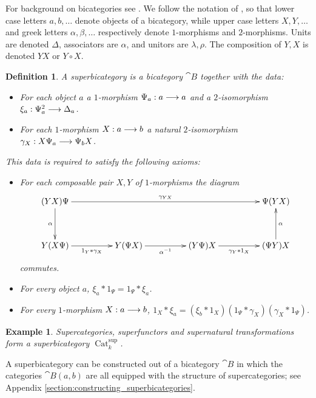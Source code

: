 \documentclass[english,letter paper,12pt,leqno]{article}
\theoremstyle{example}
\newtheorem{definition}[theorem]{Definition}
\newtheorem{example}[theorem]{Example}
\numberwithin{equation}{section}
\DeclareMathOperator{\Cat}{Cat}
\begin{document}
For background on bicategories see \cite{bor94, benabou, gray, kellystreet, lack}. We follow the notation of \cite{lgdual}, so that lower case letters $a,b, \ldots$ denote objects of a bicategory, while upper case letters $X,Y, \ldots$ and greek letters $\alpha, \beta, \ldots$ respectively denote $1$-morphisms and $2$-morphisms. Units are denoted $\Delta$, associators are $\alpha$, and unitors are $\lambda, \rho$. The composition of $Y,X$ is denoted $YX$ or $Y \circ X$.

\begin{definition} A \emph{superbicategory} is a bicategory $\cat{B}$ together with the data:
\begin{itemize}
\item For each object $a$ a $1$-morphism $\Psi_a: a \longrightarrow a$ and a $2$-isomorphism $\xi_a: \Psi^2_a \longrightarrow \Delta_a$.
\item For each $1$-morphism $X: a \longrightarrow b$ a natural $2$-isomorphism $\gamma_X: X \Psi_a \longrightarrow \Psi_b X$.
\end{itemize}
This data is required to satisfy the following axioms:
\begin{itemize}
\item For each composable pair $X,Y$ of $1$-morphisms the diagram
\[
\xymatrix@C+2pc@R+1pc{
(YX) \Psi \ar[rrr]^-{\gamma_{YX}} \ar[d]_-{\alpha} & & & \Psi ( YX )\\
Y ( X \Psi ) \ar[r]_-{1_Y * \gamma_X} & Y( \Psi X ) \ar[r]_-{\alpha^{-1}} & ( Y \Psi ) X \ar[r]_-{\gamma_Y * 1_X} & (\Psi Y ) X \ar[u]_-{\alpha}
}
\]
commutes.
\item For every object $a$, $\xi_a * 1_\Psi = 1_\Psi * \xi_a$.
\item For every $1$-morphism $X : a \longrightarrow b$, $1_X * \xi_a = ( \xi_b * 1_X ) ( 1_\Psi * \gamma_X ) (\gamma_X * 1_\Psi )$.
\end{itemize}
\end{definition}

\begin{example} Supercategories, superfunctors and supernatural transformations form a superbicategory $\Cat^{\operatorname{sup}}_k$.
\end{example}

A superbicategory can be constructed out of a bicategory $\cat{B}$ in which the categories $\cat{B}(a,b)$ are all equipped with the structure of supercategories; see Appendix \ref{section:constructing_superbicategories}.
\end{document}
